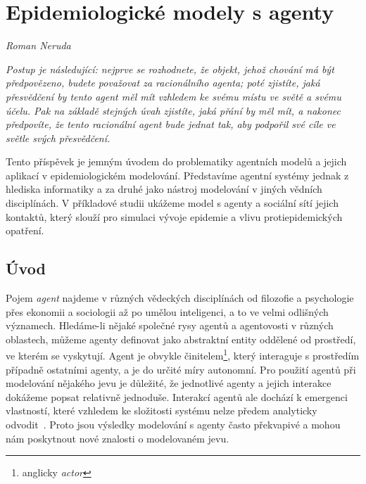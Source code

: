 
\chapter{Epidemiologické modely s agenty}\label{Modely_Agenty}

\textit{Roman Neruda}
\vspace{15mm}



 
\setlength{\epigraphrule}{0pt}
\setlength{\epigraphwidth}{.6\textwidth}
\epigraph{\textit{\flushepinormal
Postup je následující: nejprve se rozhodnete, že objekt, jehož chování má být předpovězeno, budete považovat za racionálního agenta; poté zjistíte, jaká přesvědčení by tento agent měl mít vzhledem ke svému místu ve světě a svému účelu. Pak na základě stejných úvah zjistíte, jaká přání by měl mít, a nakonec předpovíte, že tento racionální agent bude jednat tak, aby podpořil své cíle ve světle svých přesvědčení.}} 
{\cite{Dennett87}}


Tento příspěvek je jemným úvodem do problematiky agentních modelů a jejich aplikací v epidemiologickém modelování. Představíme agentní systémy jednak z hlediska informatiky a za druhé jako nástroj modelování v jiných vědních disciplínách. V příkladové studii ukážeme model s agenty a sociální sítí jejich kontaktů, který slouží pro simulaci vývoje epidemie a vlivu protiepidemických opatření.

\section*{Úvod} 

Pojem \emph{agent} najdeme v různých vědeckých disciplínách od filozofie a psychologie přes ekonomii a sociologii až po umělou inteligenci, a to ve velmi odlišných významech. Hledáme-li nějaké společné rysy agentů a agentovosti v různých oblastech, můžeme agenty definovat jako abstraktní entity oddělené od prostředí, ve kterém se vyskytují. Agent je obvykle činitelem\footnote{anglicky \emph{actor}}, který interaguje s prostředím případně ostatními agenty, a je do určité míry autonomní. Pro použití agentů při modelování nějakého jevu je důležité, že jednotlivé agenty a jejich interakce dokážeme popsat relativně jednoduše. Interakcí agentů ale dochází k emergenci vlastností, které vzhledem ke složitosti systému nelze předem analyticky odvodit~\cite{Symons18}. Proto jsou výsledky modelování s agenty často překvapivé a mohou nám poskytnout nové znalosti o modelovaném jevu. 

